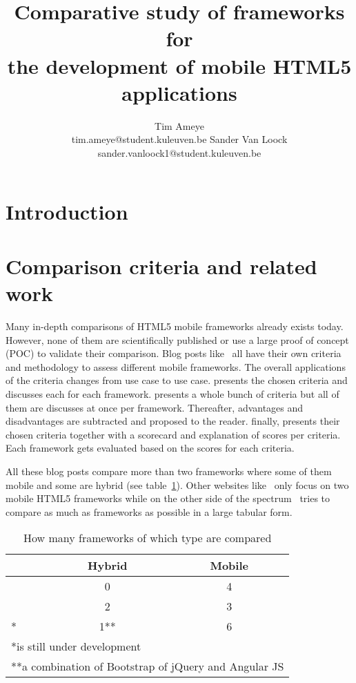 \documentclass[a4paper]{artikel3}
\title{Comparative study of frameworks for \\ the development of mobile HTML5 applications}
\author{Tim Ameye \\ tim.ameye@student.kuleuven.be \And Sander Van Loock \\ sander.vanloock1@student.kuleuven.be}
\begin{document}
\maketitle

\begin{abstract}

\end{abstract}

\section{Introduction} %
\label{sec:introduction}

\section{Comparison criteria and related work}
\label{sec:comparisoncriteria}


Many in-depth comparisons of HTML5 mobile frameworks already exists today.  However, none of them are scientifically published or use a large proof of concept (POC) to validate their comparison.  Blog posts like~\cite{Sarrafi2012a,Ayuso2012,Rozynski2011} all have their own criteria and methodology to assess different mobile frameworks.  The overall applications of the criteria changes from use case to use case.  \cite{Rozynski2011} presents the chosen criteria and discusses each for each framework.  \cite{Ayuso2012} presents a whole bunch of criteria but all of them are discusses at once per framework.  Thereafter,  advantages and disadvantages are subtracted and proposed to the reader.  \cite{Sarrafi2012a} finally,  presents their chosen criteria together with a scorecard and explanation of scores per criteria.  Each framework gets evaluated based on the scores for each criteria.

All these blog posts compare more than two frameworks where some of them mobile and some are hybrid (see table~\ref{table:references_frameworks}).  Other websites like~\cite{Bristowe2012,Burris} only focus on two mobile HTML5 frameworks while on the other side of the spectrum~\cite{Falk2011} tries to compare as much as frameworks as possible in a large tabular form.


\begin{table}[h!]
\centering
\begin{tabular}{lcc}
  & \textbf{Hybrid} & \textbf{Mobile}\\
  \hline \hline
\cite{Sarrafi2012a} & 0 & 4\\
\cite{Rozynski2011} & 2 & 3\\
\cite{Ayuso2012}* & 1** & 6\\
\hline
\multicolumn{3}{l}{*is still under development} \\
\multicolumn{3}{l}{**a combination of Bootstrap of jQuery and Angular JS} \\
\end{tabular}
\caption{How many frameworks of which type are compared}
\label{table:references_frameworks}
\end{table}
\end{document}
